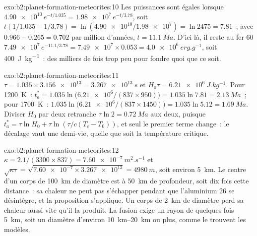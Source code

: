 \begin{solution}{exo:b2:planet-formation-meteorites:10}
Les puissances sont égales lorsque $\num{4.90e10}\,e^{-t/1.035} = \num{1.98e7}\,e^{-t/3.78}$, soit
$t(1/1.035 - 1/3.78) = \ln(\num{4.90e10}/\num{1.98e7}) = \ln 2475 = 7.81$~; avec $0.966 - 0.265 = 0.702$ par million d'années,
$t = \qty{11.1}{Ma}$. D'ici là,
il reste au fer 60 $\num{7.49e7}\,e^{-11.1/3.78} = \num{7.49e7}\times0.053 =
\qty{4.0e6}{erg.g^{-1}}$, soit \qty{400}{J.kg^{-1}}~: des milliers de fois trop peu
pour fondre quoi que ce soit.
\end{solution}

\begin{solution}{exo:b2:planet-formation-meteorites:11}
$\tau = 1.035\times\num{3.156e13} = \qty{3.267e13}{s}$ et
$H_0\tau = \qty{6.21e6}{J.kg^{-1}}$. Pour \qty{1200}{K}~:
$t_a^* = 1.035\ln\bigl(\num{6.21e6}/(837\times950)\bigr) = 1.035\ln7.81 =
\qty{2.13}{Ma}$~; pour \qty{1700}{K}~: $1.035\ln\bigl(\num{6.21e6}/(837\times1450)\bigr)
= 1.035\ln5.12 = \qty{1.69}{Ma}$. Diviser $H_0$ par deux retranche $\tau\ln2 =
\qty{0.72}{Ma}$ aux deux, puisque $t_a^* = \tau\ln H_0 + \tau\ln(\tau/c(T_c -
T_0))$, et seul le premier terme change~: le décalage vaut une demi-vie, quelle que soit
la température critique.
\end{solution}

\begin{solution}{exo:b2:planet-formation-meteorites:12}
$\kappa = 2.1/(3300\times837) = \qty{7.60e-7}{m^2.s^{-1}}$ et
$\sqrt{\kappa\tau} = \sqrt{\num{7.60e-7}\times\num{3.267e13}} = \qty{4980}{m}$, soit environ \qty{5}{km}.
Le centre d'un corps de \qty{100}{km} de diamètre est à \qty{50}{km} de profondeur, soit dix fois cette
distance~: sa chaleur ne peut pas s'échapper pendant que l'aluminium 26 se désintègre, et la proposition
s'applique. Un corps de \qty{2}{km} de diamètre perd sa chaleur aussi vite qu'il la produit. La fusion
exige un rayon de quelques fois \qty{5}{km}, soit un diamètre d'environ \qtyrange{10}{20}{km} ou plus,
comme le trouvent les modèles.
\end{solution}

